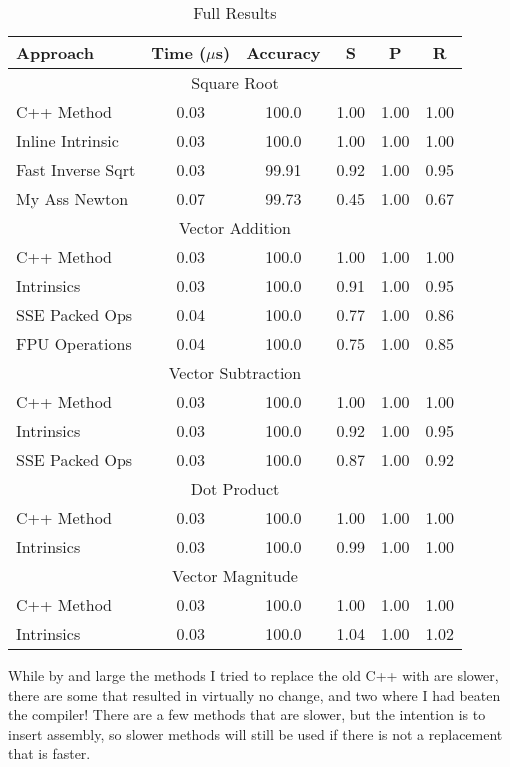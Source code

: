 \documentclass{article}
\begin{document}
\begin{table}[ht!]
\centering
\begin{tabular}{|l|c|c|c|c|c|}
\hline
Approach            &   Time ($\mu$s) &   Accuracy  & S &   P   &   R   \\
\hline
\multicolumn{6}{|c|}{Square Root} \\
\hline
C++ Method          &  0.03  &  100.0  &  1.00  &  1.00  &  1.00  \\
Inline Intrinsic    &  0.03  &  100.0  &  1.00  &  1.00  &  1.00  \\
Fast Inverse Sqrt   &  0.03  &  99.91  &  0.92  &  1.00  &  0.95  \\
My Ass Newton       &  0.07  &  99.73  &  0.45  &  1.00  &  0.67  \\
\hline
\multicolumn{6}{|c|}{Vector Addition} \\
\hline
C++ Method          &  0.03  &  100.0  &  1.00  &  1.00  &  1.00  \\
Intrinsics          &  0.03  &  100.0  &  0.91  &  1.00  &  0.95  \\
SSE Packed Ops      &  0.04  &  100.0  &  0.77  &  1.00  &  0.86  \\
FPU Operations      &  0.04  &  100.0  &  0.75  &  1.00  &  0.85  \\
\hline
\multicolumn{6}{|c|}{Vector Subtraction} \\
\hline
C++ Method          &  0.03  &  100.0  &  1.00  &  1.00  &  1.00  \\
Intrinsics          &  0.03  &  100.0  &  0.92  &  1.00  &  0.95  \\
SSE Packed Ops      &  0.03  &  100.0  &  0.87  &  1.00  &  0.92  \\
\hline
\multicolumn{6}{|c|}{Dot Product} \\
\hline
C++ Method          &  0.03  &  100.0  &  1.00  &  1.00  &  1.00  \\
Intrinsics          &  0.03  &  100.0  &  0.99  &  1.00  &  1.00  \\
\hline
\multicolumn{6}{|c|}{Vector Magnitude} \\
\hline
C++ Method          &  0.03  &  100.0  &  1.00  &  1.00  &  1.00  \\
Intrinsics          &  0.03  &  100.0  &  1.04  &  1.00  &  1.02  \\
\hline
\end{tabular}
\caption{Full Results}
\end{table}

While by and large the methods I tried to replace the old C++ with are slower, there are some that resulted in virtually no change, and two where I had beaten the compiler! There are a few methods that are slower, but the intention is to insert assembly, so slower methods will still be used if there is not a replacement that is faster. 
\end{document}
